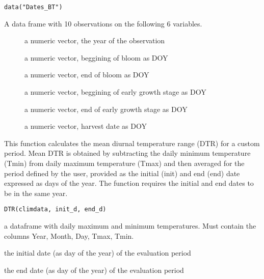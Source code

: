 \documentclass[a4paper]{book}
\begin{document}
%
\begin{Usage}
\begin{verbatim}
data("Dates_BT")
\end{verbatim}
\end{Usage}
%
\begin{Format}
A data frame with 10 observations on the following 6 variables.
\begin{description}

\item[] a numeric vector, the year of the observation
\item[] a numeric vector, beggining of bloom as DOY
\item[] a numeric vector, end of bloom as DOY
\item[] a numeric vector, beggining of early growth stage as DOY
\item[] a numeric vector, end of early growth stage as DOY
\item[] a numeric vector, harvest date as DOY

\end{description}

\end{Format}
%
\begin{Description}\relax
This function calculates the mean diurnal temperature range (DTR) for
a custom period. Mean DTR is obtained by subtracting the daily minimum
temperature (Tmin) from daily maximum temperature (Tmax) and then
averaged for the period defined by the user, provided as the initial
(init) and end (end) date expressed as days of the year. The function
requires the initial and end dates to be in the same year.
\end{Description}
%
\begin{Usage}
\begin{verbatim}
DTR(climdata, init_d, end_d)
\end{verbatim}
\end{Usage}
%
\begin{Arguments}
\begin{ldescription}
\item[\code{climdata}] a dataframe with daily maximum and minimum temperatures.
Must contain the columns Year, Month, Day, Tmax, Tmin.

\item[\code{init\_d}] the initial date (as day of the year) of the evaluation period

\item[\code{end\_d}] the end date (as day of the year) of the evaluation period
\end{ldescription}
\end{Arguments}
\end{document}
